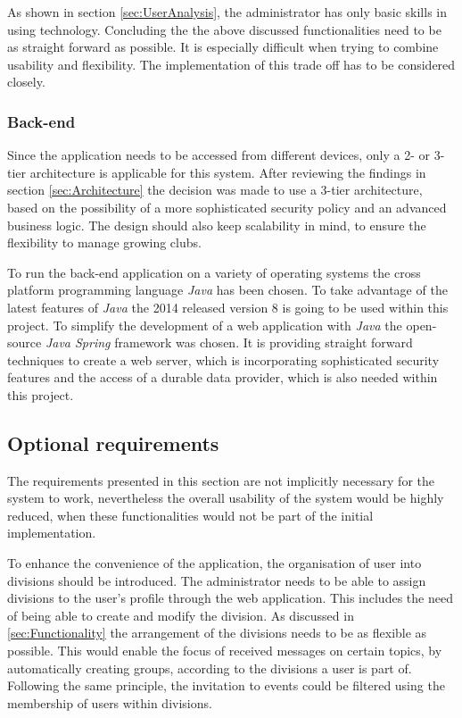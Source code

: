 As shown in section \vref{sec:UserAnalysis}, the administrator has only basic skills in using technology. Concluding the the above discussed functionalities need to be as straight forward as possible. It is especially difficult when trying to combine usability and flexibility. The implementation of this trade off has to be considered closely.

\subsubsection{Back-end}

Since the application needs to be accessed from different devices, only a 2- or 3-tier architecture is applicable for this system. After reviewing the findings in section \vref{sec:Architecture} the decision was made to use a 3-tier architecture, based on the possibility of a more sophisticated security policy and an advanced business logic. The design should also keep scalability in mind, to ensure the flexibility to manage growing clubs.

To run the back-end application on a variety of operating systems the cross platform programming language \emph{Java} has been chosen. To take advantage of the latest features of \emph{Java} the 2014 released version 8 is going to be used within this project. To simplify the development of a web application with \emph{Java} the open-source \emph{Java Spring} framework was chosen. It is providing straight forward techniques to create a web server, which is incorporating sophisticated security features and the access of a durable data provider, which is also needed within this project.

\subsection{Optional requirements} %
The requirements presented in this section are not implicitly necessary for the system to work, nevertheless the overall usability of the system would be highly reduced, when these functionalities would not be part of the initial implementation.

To enhance the convenience of the application, the organisation of user into divisions should be introduced. The administrator needs to be able to assign divisions to the user's profile through the web application. This includes the need of being able to create and modify the division. As discussed in \vref{sec:Functionality} the arrangement of the divisions needs to be as flexible as possible. This would enable the focus of received messages on certain topics, by automatically creating groups, according to the divisions a user is part of. Following the same principle, the invitation to events could be filtered using the membership of users within divisions.

